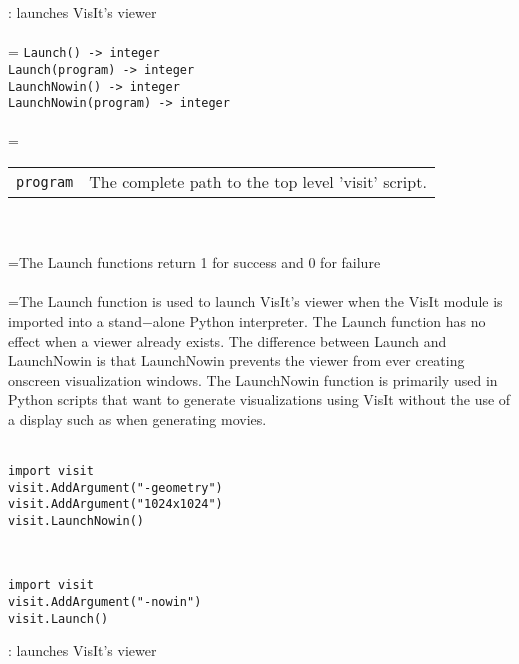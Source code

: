 \documentclass[10pt,a4paper]{report}
\begin{document}
{}
: launches VisIt's viewer\\[-3mm]

 \\ 
\hangindent=\parindent 
\verb!Launch() -> integer!\\ 
\verb!Launch(program) -> integer!\\ 
\verb!LaunchNowin() -> integer!\\ 
\verb!LaunchNowin(program) -> integer!\\ [-3mm]

 \\ 
\hangindent=\parindent 
\begin{tabular}{lp{9cm}}
\verb!program! & The complete path to the top level 'visit' script. \\
\end{tabular} \\[-2mm]


 \\ 
\hangindent=\parindent The Launch functions return 1 for success and 0 for failure \\[-3mm] 

 \\ 
\hangindent=\parindent The Launch function is used to launch VisIt's viewer when the VisIt module is imported into a stand$-$alone Python interpreter. The Launch function has no effect when a viewer already exists. The difference between Launch and LaunchNowin is that LaunchNowin prevents the viewer from ever creating onscreen visualization windows. The LaunchNowin function is primarily used in Python scripts that want to generate visualizations using VisIt without the use of a display such as when generating movies. \\[-3mm] 

\\[-6mm]
\begin{verbatim}import visit
visit.AddArgument("-geometry")
visit.AddArgument("1024x1024")
visit.LaunchNowin()
\end{verbatim}
\\[-6mm]
\begin{verbatim}import visit
visit.AddArgument("-nowin")
visit.Launch()
\end{verbatim}
\newpage


{}
: launches VisIt's viewer\\[-3mm]
\end{document}
